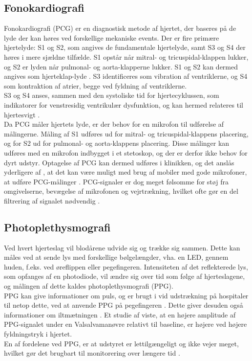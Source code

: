 \subsection{Fonokardiografi}
Fonokardiografi (PCG) er en diagnostisk metode af hjertet, der baseres på de lyde der kan høres ved forskellige mekaniske events. Der er fire primære hjertelyde: S1 og S2, som angives de fundamentale hjertelyde, samt S3 og S4 der høres i mere sjældne tilfælde. S1 opstår når mitral- og tricuspidal-klappen lukker, og S2 er lyden når pulmonal- og aorta-klapperne lukker. S1 og S2 kan dermed angives som hjerteklap-lyde \citep{kovacs2011fetal}. S3 identificeres som vibration af ventriklerne, og S4 som kontraktion af atrier, begge ved fyldning af ventriklerne. \citep{singh2013heart}\\
S3 og S4 anses, sammen med den systoliske tid for hjertecyklussen, som indikatorer for venstresidig ventrikulær dysfunktion, og kan hermed relateres til hjertesvigt \citep{marcus2005association}\citep{shapiro2007diagnostic}.\\
Da PCG måler hjertets lyde, er der behov for en mikrofon til udførelse af målingerne. Måling af S1 udføres ud for mitral- og tricuspidal-klappens placering, og for S2 ud for pulmonal- og aorta-klappens placering. Disse målinger kan udføres med en mikrofon indbygget i et stetoskop, og der er derfor ikke behov for dyrt udstyr. Optagelse af PCG kan dermed udføres i klinikken, og det anslås yderligere af \citet{singh2013heart}, at det kan være muligt med brug af mobiler med gode mikrofoner, at udføre PCG-målinger \citep{singh2013heart}. PCG-signaler er dog meget følsomme for støj fra omgivelserne, bevægelse af mikrofonen og vejrtrækning, hvilket ofte gør en del filtrering af signalet nødvendig \citep{jain2014}.

\subsection{Photoplethysmografi}
Ved hvert hjerteslag vil blodårene udvide sig og trække sig sammen. Dette kan måles ved at sende lys med forskellige bølgelængder, vha. en LED, gennem huden, f.eks. ved øreflippen eller pegefingeren. Intensiteten af det reflekterede lys, som opfanges af en photodiode, vil ændre sig over tid som følge af hjerteslagene, og målingen af dette kaldes photoplethysmografi (PPG). \citep{jain2014}\\
PPG kan give informationer om puls, og er brugt i vid udstrækning på hospitaler til netop dette, ved at anvende PPG på pegefingeren \citep{jain2014}. Dette giver desuden også informationer om iltmætningen \citep{jain2014}. Et studie af \citet{Gilotra2016} viste, at en højere amplitude af PPG-signalet under en Valsalvamanøvre relativt til baseline, er højere ved højere fyldningstryk i hjertet.\\
En af fordelene ved PPG, er at udstyret er lettilgængeligt og ikke vejer meget, hvilket gør det brugbart til monitorering over længere tid \citep{jain2014}.

